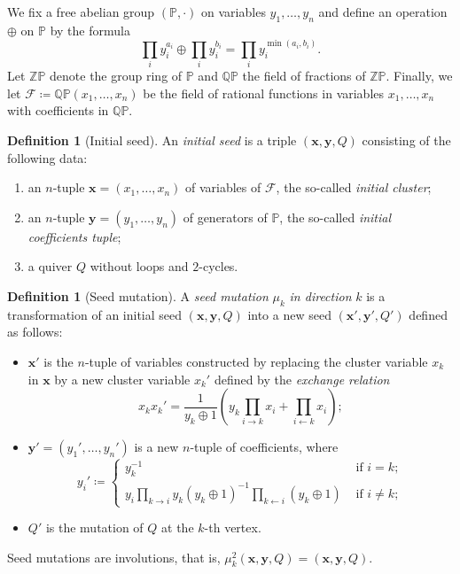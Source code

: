 \documentclass[a4paper,oneside,svgnames]{amsart}
\theoremstyle{plain}
\theoremstyle{definition}
\newtheorem{definition}[theorem]{Definition}
\begin{document}
 We fix a free abelian group $(\mathbb{P}, \cdot )$ on variables
 $y_1,\ldots,y_n$ and define an operation $ \oplus $ on $\mathbb{P}$ by the
 formula
 \[
  \prod_i y_i^{a_i} \oplus \prod_i y_i^{b_i} = \prod_i y_i^{\min(a_i,b_i)}.
 \]
 Let $\mathbb{Z}\mathbb{P}$ denote the group ring of $\mathbb{P}$ and
 $\mathbb{Q}\mathbb{P}$ the field of fractions of $\mathbb{Z}\mathbb{P}$.
 Finally, we let $\mathcal{F} \coloneqq \mathbb{Q}\mathbb{P}(x_1,\ldots,x_n)$ be
 the field of rational functions in variables $x_1,\ldots,x_n$ with coefficients
 in $\mathbb{Q}\mathbb{P}$.

 \begin{definition}[Initial seed]
  An \emph{initial seed} is a triple $(\mathbf{x},\mathbf{y},Q)$ consisting of
  the following data:
  \begin{enumerate}
   \item an $n$-tuple $\mathbf{x} = (x_1,\ldots,x_n)$ of variables of
    $\mathcal{F}$, the so-called \emph{initial cluster};
   \item an $n$-tuple $\mathbf{y} = (y_1,\ldots,y_n)$ of generators of
    $\mathbb{P}$, the so-called \emph{initial coefficients tuple};
   \item a quiver $Q$ without loops and $2$-cycles.
  \end{enumerate}
 \end{definition}

 \begin{definition}[Seed mutation]
  A \emph{seed mutation} $\mu_k$ \emph{in direction} $k$ is a transformation of
  an initial seed $(\mathbf{x},\mathbf{y},Q)$ into a new seed
  $(\mathbf{x'},\mathbf{y'},Q')$ defined as follows:
  \begin{itemize}
   \item $\mathbf{x'}$ is the $n$-tuple of variables constructed by replacing
    the cluster variable $x_k$ in $\mathbf{x}$ by a new cluster variable $x_k'$
    defined by the \emph{exchange relation}
    \[
     x_kx_k' = \frac{1}{y_k \oplus 1}\left( y_k \prod_{i \to k} x_i +
     \prod_{i \leftarrow k} x_i \right);
    \]
   \item $\mathbf{y'} = (y_1',\ldots,y_n')$ is a new $n$-tuple of coefficients,
    where
    \[
     y_i' \coloneqq \begin{cases}
      y_k^{-1} & \text{ if } i = k;\\
      y_i \prod_{k \to i} y_k(y_k \oplus 1)^{-1}\prod_{k \leftarrow i} (y_k
      \oplus 1) & \text{ if } i \neq k;
     \end{cases}
    \]
   \item $Q'$ is the mutation of $Q$ at the $k$-th vertex.
  \end{itemize}
 \end{definition}
 Seed mutations are involutions, that is, $\mu_k^2(\mathbf{x},\mathbf{y},Q) =
 (\mathbf{x},\mathbf{y},Q)$.
\end{document}
